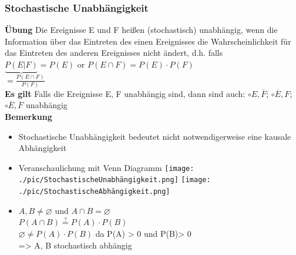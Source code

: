   \subsubsection{Stochastische Unabhängigkeit}
  \textbf{Übung}
  Die Ereignisse E und F heißen (stochastisch) unabhängig, wenn die Information über das Eintreten des einen Ereignisses die Wahrscheinlichkeit für das Eintreten des anderen Ereignisses nicht ändert, d.h. falls\\
  $\underbrace{P(E|F)}= P(E)  \text{ or }   P(E\cap F) = P(E) \cdot P(F)$\\
  $= \frac{P(E \cap F)}{P(F)}$\\
  \textbf{Es gilt}
  Falls die Ereignisse E, F unabhängig sind, dann sind auch: 
  $\circ  E, \overline{F}$;  
  $\circ  \overline{E} , F$;  
  $\circ \overline{E}, \overline{F}$ unabhängig\\
  \textbf{Bemerkung}
  \begin{itemize}
  	\item Stochastische Unabhängigkeit bedeutet nicht notwendigerweise eine kausale Abhängigkeit
  	\item Veranschaulichung mit Venn Diagramm
  	  \texttt{[image: ./pic/StochastischeUnabhängigkeit.png]}
  	  \texttt{[image: ./pic/StochastischeAbhängigkeit.png]}
  	\item $A, B \ne \varnothing$ und $A \cap B  = \varnothing$\\
  	$P(A\cap B) \stackrel{?}{=} P(A) \cdot P(B)$\\
  	$\varnothing \ne P(A) \cdot P(B)$ da P(A) > 0 und P(B)> 0\\
  	=> A, B stochastisch abhängig
  \end{itemize}
  
  